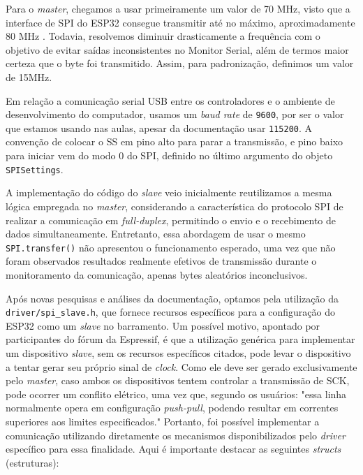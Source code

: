\documentclass[a4paper,oneside,10pt]{article}
\begin{document}
Para o \textit{master}, chegamos a usar primeiramente um valor de 70 MHz, visto que a interface de SPI do ESP32 consegue transmitir até no máximo, aproximadamente 80 MHz \cite{espressifSPI}. Todavia, resolvemos diminuir drasticamente a frequência com o objetivo de evitar saídas inconsistentes no Monitor Serial, além de termos maior certeza que o byte foi transmitido. Assim, para padronização, definimos um valor de 15MHz.

Em relação a comunicação serial USB entre os controladores e o ambiente de desenvolvimento do computador, usamos um \textit{baud rate} de \texttt{9600}, por ser o valor que estamos usando nas aulas, apesar da documentação usar \texttt{115200}. A convenção de colocar o SS em pino alto para parar a transmissão, e pino baixo para iniciar vem do modo 0 do SPI, definido no último argumento do objeto \texttt{SPISettings}. 
\newline



A implementação do código do \textit{slave} veio inicialmente reutilizamos a mesma lógica empregada no \textit{master}, considerando a característica do protocolo SPI de realizar a comunicação em \textit{full-duplex}, permitindo o envio e o recebimento de dados simultaneamente. Entretanto, essa abordagem de usar o mesmo \texttt{SPI.transfer()} não apresentou o funcionamento esperado, uma vez que não foram observados resultados realmente efetivos de transmissão durante o monitoramento da comunicação, apenas bytes aleatórios inconclusivos. 

Após novas pesquisas e análises da documentação, optamos pela utilização da \texttt{driver/spi\_slave.h}, que fornece recursos específicos para a configuração do ESP32 como um \textit{slave} no barramento. Um possível motivo, apontado por participantes do fórum da Espressif, é que a utilização genérica para implementar um dispositivo \textit{slave}, sem os recursos específicos citados, pode levar o dispositivo a tentar gerar seu próprio sinal de \textit{clock}. Como ele deve ser gerado exclusivamente pelo \textit{master}, caso ambos os dispositivos tentem controlar a transmissão de SCK, pode ocorrer um conflito elétrico, uma vez que, segundo os usuários: "essa linha normalmente opera em configuração \textit{push-pull}, podendo resultar em correntes superiores aos limites especificados."\cite{espressifSPISlave}
\newline
Portanto, foi possível implementar a comunicação utilizando diretamente os mecanismos disponibilizados pelo \textit{driver} específico para essa finalidade. Aqui é importante destacar as seguintes \textit{structs} (estruturas):
\end{document}
